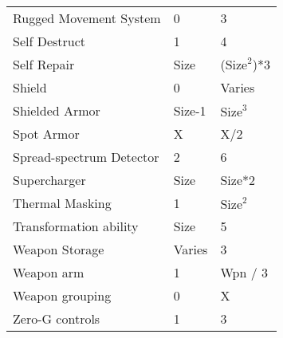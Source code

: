 \documentclass[twoside]{book}
\begin{document}
\begin{longtable}{p{1.25in}ll}
      \raggedright Rugged Movement System & 0 & 3 \tabularnewline
      \raggedright Self Destruct & 1 & 4 \tabularnewline
      \raggedright Self Repair & Size & (\begin{math}{\textrm{Size}}^{2}\end{math})*3 \tabularnewline
      \raggedright Shield & 0 & Varies \tabularnewline
      \raggedright Shielded Armor & Size-1 & \begin{math}{\textrm{Size}}^{3}\end{math} \tabularnewline
      \raggedright Spot Armor & X & X/2 \tabularnewline
      \raggedright Spread-spectrum Detector
           & 2 & 6 \tabularnewline
      \raggedright Supercharger & Size & Size*2 \tabularnewline
      \raggedright Thermal Masking & 1 & \begin{math}{\textrm{Size}}^{2}\end{math} \tabularnewline
      \raggedright Transformation ability & Size & 5 \tabularnewline
      \raggedright Weapon Storage & Varies & 3 \tabularnewline
      \raggedright Weapon arm & 1 & Wpn / 3 \tabularnewline
      \raggedright Weapon grouping & 0 & X \tabularnewline
      \raggedright Zero-G controls & 1 & 3 \tabularnewline
      
\end{longtable}
    
\end{document}
